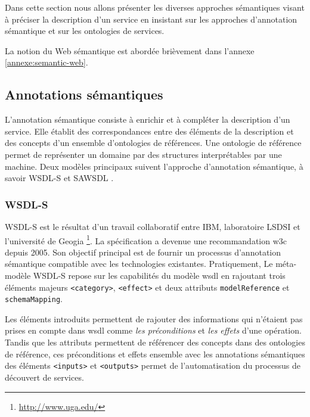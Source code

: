 Dans cette section nous allons présenter les diverses approches
sémantiques visant à préciser la description d'un service en insistant
sur les approches d'annotation sémantique et sur les ontologies de
services.

La notion du Web sémantique est abordée brièvement dans l'annexe
\ref{annexe:semantic-web}.

  \subsection{Annotations sémantiques}
  \label{sec:semantic-annot}

  L'annotation sémantique consiste à enrichir et à compléter la
  description d'un service. Elle établit des correspondances entre des
  éléments de la description et des concepts d'un ensemble
  d'ontologies de références. Une ontologie de référence permet de
  représenter un domaine par des structures interprétables par une
  machine. Deux modèles principaux suivent l'approche d'annotation
  sémantique, à savoir \textsc{WSDL-S} et \textsc{SAWSDL}
  \cite{elie2010}.

    \subsubsection{WSDL-S}
    \textsc{WSDL-S} \cite{akkiraju2005web} est le résultat d'un
    travail collaboratif entre IBM, laboratoire LSDSI et l'université
    de Geogia \footnote{\url{http://www.uga.edu/}}. La spécification a
    devenue une recommandation \acrshort{w3c} depuis 2005. Son
    objectif principal est de fournir un processus d'annotation
    sémantique compatible avec les technologies
    existantes. Pratiquement, Le méta-modèle \textsc{WSDL-S} repose
    sur les capabilités du modèle \acrshort{wsdl} en rajoutant trois
    éléments majeurs \texttt{<category>}, \texttt{<effect>} et deux
    attributs \texttt{modelReference} et \texttt{schemaMapping}.

    Les éléments introduits permettent de rajouter des informations
    qui n'étaient pas prises en compte dans \acrshort{wsdl} comme
    \emph{les préconditions} et \emph{les effets} d'une
    opération. Tandis que les attributs permettent de référencer des
    concepts dans des ontologies de référence, ces préconditions et
    effets ensemble avec les annotations sémantiques des éléments
    \texttt{<inputs>} et \texttt{<outputs>} permet de l'automatisation
    du processus de découvert de services.

